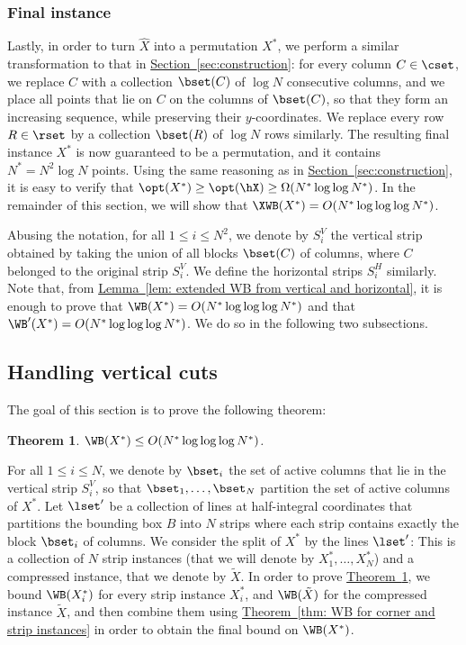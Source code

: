 \documentclass[11pt]{article}
\numberwithin{equation}{section}
\newtheorem{theorem}{Theorem}[section]
\theoremstyle{definition}
\theoremstyle{plain}
\newcommand{\expref}[2]{\hyperref[#2]{#1~\ref{#2}}}
\begin{document}
\subsubsection{Final instance}


Lastly, in order to turn $\hat X$ into a permutation $X^*$, we perform a similar transformation to that in \expref{Section}{sec:construction}: for every column $C\in \cset$, we replace $C$ with a collection $\bset(C)$ of $\log N$ consecutive columns, and we place all points that lie on $C$ on the columns of $\bset(C)$, so that they form an increasing sequence, while preserving their $y$-coordinates. We replace every row $R\in \rset$ by a collection $\bset(R)$ of $\log N$ rows similarly. The resulting final instance $X^*$ is now guaranteed to be a permutation, and it contains $N^*=N^2\log N$ points. Using the same reasoning as in \expref{Section}{sec:construction}, it is easy to verify that $\opt(X^*)\geq \opt(\hX)\geq \Omega(N^*\log\log N^*)$. In the remainder of this section, we will show that $\XWB(X^*)=O(N^*\log\log \log N^*)$. 

Abusing the notation, for all $1\leq i\leq N^2$, we denote by $S^V_i$ the vertical strip obtained by taking the union of all blocks $\bset(C)$ of columns, where $C$ belonged to the original strip $S^V_i$. We define the horizontal strips $S^H_i$ similarly. Note that, from \expref{Lemma}{lem: extended WB from vertical and horizontal}, it is enough to prove that $\WB(X^*)=O(N^*\log\log \log N^*)$ and that  $\WB'(X^*)=O(N^*\log\log \log N^*)$. We do so in the following two subsections.


%
%
%
%
\subsection{Handling vertical cuts}\label{subsec: bounding WB vertical}
%
%
%
%
The goal of this section is to prove the following theorem:

\begin{theorem}\label{thm: boundinb WB vertical}
	$\WB(X^*)\leq O(N^*\log\log\log N^*)$.
\end{theorem}

For all $1\leq i\leq N$, we denote by $\bset_i$ the set of active columns that lie in the vertical strip $S^V_i$, so that $\bset_1,\ldots,\bset_N$ partition the set of active columns of $X^*$.
Let $\lset'$ be a collection of lines at half-integral coordinates that partitions the bounding box $B$ into $N$ strips where each strip contains exactly the block $\bset_i$ of columns. 
We consider the split of $X^*$ by the lines $\lset'$: This is a collection of $N$ strip instances (that we will denote by $X^*_1,\ldots,X^*_N$) and a compressed instance, that we denote by $\tilde X$.     
%
%
In order to prove \expref{Theorem}{thm: boundinb WB vertical}, we bound $\WB(X^*_i)$ for every strip instance $X^*_i$, and $\WB(\tilde X)$ for the compressed instance $\tilde X$, and then combine them using \expref{Theorem}{thm: WB for corner and strip instances} in order to obtain the final bound on $\WB(X^*)$.
\end{document}
